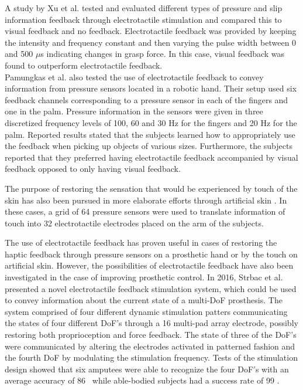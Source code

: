 A study by Xu et al. \cite{Xu2016} tested and evaluated different types of pressure and slip information feedback through electrotactile stimulation and compared this to visual feedback and no feedback. Electrotactile feedback was provided by keeping the intensity and frequency constant and then varying the pulse width between 0 and 500 $\mu $s indicating changes in grasp force. In this case, visual feedback was found to outperform electrotactile feedback. \cite{Xu2016} \\
Pamungkas et al. \cite{Pamungkas2015} also tested the use of electrotactile feedback to convey information from pressure sensors located in a robotic hand. Their setup used six feedback channels corresponding to a pressure sensor in each of the fingers and one in the palm. Pressure information in the sensors were given in three discretized frequency levels of 100, 60 and 30 Hz for the fingers and 20 Hz for the palm. Reported results stated that the subjects learned how to appropriately use the feedback when picking up objects of various sizes. Furthermore, the subjects reported that they preferred having electrotactile feedback accompanied by visual feedback opposed to only having visual feedback. \cite{Pamungkas2015} 

The purpose of restoring the sensation that would be experienced by touch of the skin has also been pursued in more elaborate efforts through artificial skin \cite{Hartmann2014,Franceschi2015}. In these cases, a grid of 64 pressure sensors were used to translate information of touch into 32 electrotactile electrodes placed on the arm of the subjects. 

The use of electrotactile feedback has proven useful in cases of restoring the haptic feedback through pressure sensors on a prosthetic hand or by the touch on artificial skin. However, the possibilities of electrotactile feedback have also been investigated in the case of improving prosthetic control. In 2016, Strbac et al. \cite{Strbac2016} presented a novel electrotactile feedback stimulation system, which could be used to convey information about the current state of a multi-DoF prosthesis. The system comprised of four different dynamic stimulation patters communicating the states of four different DoF's through a 16 multi-pad array electrode, possibly restoring both proprioception and force feedback. The state of three of the DoF's were communicated by altering the electrodes activated in patterned fashion and the fourth DoF by modulating the stimulation frequency. Tests of the stimulation design showed that six amputees were able to recognize the four DoF's with an average accuracy of 86 \percent~while able-bodied subjects had a success rate of 99 \percent. \cite{Strbac2016}   


